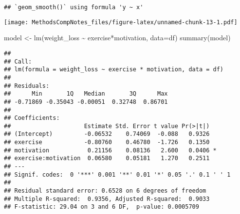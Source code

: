 \documentclass[
]{article}
\newenvironment{Shaded}{\begin{snugshade}}{\end{snugshade}}
\newcommand{\AttributeTok}[1]{\textcolor[rgb]{0.77,0.63,0.00}{#1}}
\newcommand{\FunctionTok}[1]{\textcolor[rgb]{0.00,0.00,0.00}{#1}}
\newcommand{\NormalTok}[1]{#1}
\newcommand{\OtherTok}[1]{\textcolor[rgb]{0.56,0.35,0.01}{#1}}
\newcommand{\SpecialCharTok}[1]{\textcolor[rgb]{0.00,0.00,0.00}{#1}}
\begin{document}
\begin{verbatim}
## `geom_smooth()` using formula 'y ~ x'
\end{verbatim}

\texttt{[image: MethodsCompNotes\_files/figure-latex/unnamed-chunk-13-1.pdf]}

\begin{Shaded}
\begin{Highlighting}[]
\NormalTok{model }\OtherTok{\textless{}{-}} \FunctionTok{lm}\NormalTok{(weight\_loss }\SpecialCharTok{\textasciitilde{}}\NormalTok{ exercise}\SpecialCharTok{*}\NormalTok{motivation, }\AttributeTok{data=}\NormalTok{df)}
\FunctionTok{summary}\NormalTok{(model)}
\end{Highlighting}
\end{Shaded}

\begin{verbatim}
## 
## Call:
## lm(formula = weight_loss ~ exercise * motivation, data = df)
## 
## Residuals:
##      Min       1Q   Median       3Q      Max 
## -0.71869 -0.35043 -0.00051  0.32748  0.86701 
## 
## Coefficients:
##                     Estimate Std. Error t value Pr(>|t|)  
## (Intercept)         -0.06532    0.74069  -0.088   0.9326  
## exercise            -0.80760    0.46780  -1.726   0.1350  
## motivation           0.21156    0.08136   2.600   0.0406 *
## exercise:motivation  0.06580    0.05181   1.270   0.2511  
## ---
## Signif. codes:  0 '***' 0.001 '**' 0.01 '*' 0.05 '.' 0.1 ' ' 1
## 
## Residual standard error: 0.6528 on 6 degrees of freedom
## Multiple R-squared:  0.9356, Adjusted R-squared:  0.9033 
## F-statistic: 29.04 on 3 and 6 DF,  p-value: 0.0005709
\end{verbatim}
\end{document}
